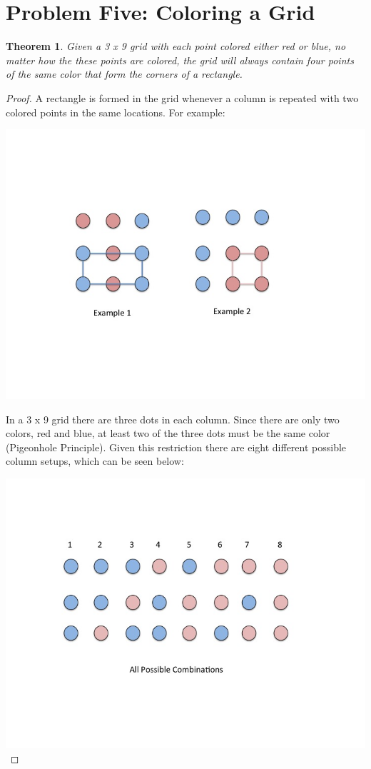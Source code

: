 \documentclass[10pt,letter]{article}
\newtheorem*{thm}{Theorem}
\begin{document}
\section*{Problem Five: Coloring a Grid}
\begin{thm} Given a 3 x 9 grid with each point colored either red or blue, no matter how the these points are colored, the grid will always contain four points of the same color that form the corners of a rectangle. 
\end{thm}
\begin{proof}
A rectangle is formed in the grid whenever a column is repeated with two colored points in the same locations. For example: \\
\begin{minipage}{.8\textwidth}
\includegraphics[width=.8\linewidth]{Slide1.jpg}
\end{minipage}

In a 3 x 9 grid there are three dots in each column. Since there are only two colors, red and blue, at least two of the three dots must be the same color (Pigeonhole Principle). Given this restriction there are eight different possible column setups, which can be seen below:

\begin{minipage}{.8\textwidth}
\includegraphics[width=.8\linewidth]{Slide2.jpg}
\end{minipage}


\end{proof}
\end{document}
